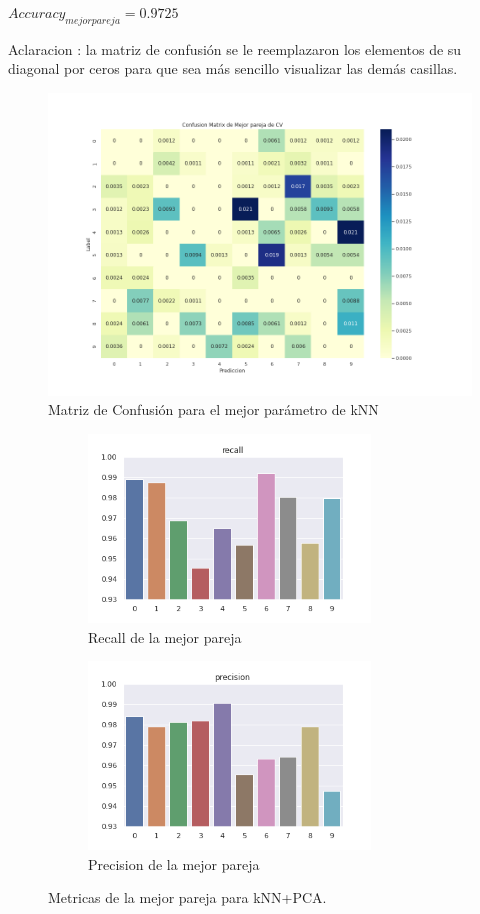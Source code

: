 \vspace{0.5cm}
$Accuracy_{mejor pareja} = 0.9725 $
\par
\vspace{0.5cm}
Aclaracion : la matriz de confusión se le reemplazaron los elementos de su diagonal por ceros para que sea más sencillo visualizar las demás casillas.
\begin{figure}[H]
    \centering
    \includegraphics[width=14cm]{images/ConfMatrix_knnpca.png}%
    \qquad
    \caption{Matriz de Confusión para el mejor parámetro de kNN }
    \label{knnpca_MatrizConf}%
\end{figure}

\begin{figure}[h]
\begin{subfigure}{0.5\textwidth}
\includegraphics[width=0.9\linewidth, height=5cm]{images/recall_knnpca.png} 
\caption{Recall de la mejor pareja}
\label{fig:metpca1}
\end{subfigure}
\begin{subfigure}{0.5\textwidth}
\includegraphics[width=0.9\linewidth, height=5cm]{images/precision_knnpca.png} 
\caption{Precision de la mejor pareja}
\label{fig:metpca2}
\end{subfigure}
\caption{Metricas de la mejor pareja para kNN+PCA.}
\label{knnpca_metricas}%
\end{figure}


